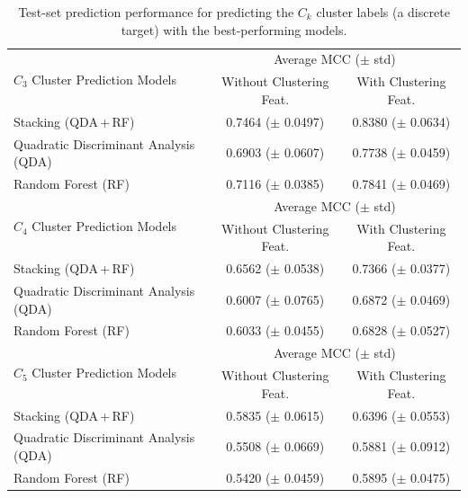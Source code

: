 \documentclass[sn-basic, Numbered]{sn-jnl} %
\begin{document}
\begin{table}[tb]
  \centering
  \caption{Test-set prediction performance for predicting the $C_k$ cluster labels (a discrete target) with the best-performing models.}
  \label{tab:cluster-prediction}
  \begin{tabular}{lcc}
    \toprule
    \multirow[c]{2}{*}{$C_3$ Cluster Prediction Models} & \multicolumn{2}{c}{Average MCC ($\pm$ std)} \\
    \cmidrule(lr){2-3}
    & {Without Clustering Feat.} & {With Clustering Feat.} \\
    \midrule
    Stacking (QDA\,+\,RF)                 & 0.7464 ($\pm$ 0.0497) & 0.8380 ($\pm$ 0.0634) \\[0.4ex]
    Quadratic Discriminant Analysis (QDA)                     & 0.6903 ($\pm$ 0.0607) & 0.7738 ($\pm$ 0.0459) \\[0.4ex]
    Random Forest (RF)         & 0.7116 ($\pm$ 0.0385) & 0.7841 ($\pm$ 0.0469) \\[0.4ex]
    \midrule
    \multirow[c]{2}{*}{$C_4$ Cluster Prediction Models} & \multicolumn{2}{c}{Average MCC ($\pm$ std)} \\
    \cmidrule(lr){2-3}
    & {Without Clustering Feat.} & {With Clustering Feat.} \\
    \midrule
    Stacking (QDA\,+\,RF)                 & 0.6562 ($\pm$ 0.0538) & 0.7366 ($\pm$ 0.0377) \\[0.4ex]
    Quadratic Discriminant Analysis (QDA)                     & 0.6007 ($\pm$ 0.0765) & 0.6872 ($\pm$ 0.0469) \\[0.4ex]
    Random Forest (RF)         & 0.6033 ($\pm$ 0.0455) & 0.6828 ($\pm$ 0.0527) \\[0.4ex]
    \midrule
    \multirow[c]{2}{*}{$C_5$ Cluster Prediction Models} & \multicolumn{2}{c}{Average MCC ($\pm$ std)} \\
    \cmidrule(lr){2-3}
    & {Without Clustering Feat.} & {With Clustering Feat.} \\
    \midrule
    Stacking (QDA\,+\,RF)                 & 0.5835 ($\pm$ 0.0615) & 0.6396 ($\pm$ 0.0553) \\[0.4ex]
    Quadratic Discriminant Analysis (QDA)                      & 0.5508 ($\pm$ 0.0669) & 0.5881 ($\pm$ 0.0912) \\[0.4ex]
    Random Forest (RF)         & 0.5420 ($\pm$ 0.0459) & 0.5895 ($\pm$ 0.0475) \\
    \bottomrule
  \end{tabular}
\end{table}
\end{document}

